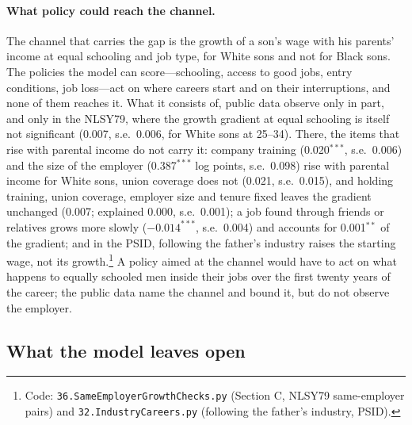\paragraph{What policy could reach the channel.} The channel that carries the gap is the growth of a son's wage with
his parents' income at equal schooling and job type, for White sons and not for Black sons. The policies the model can
score---schooling, access to good jobs, entry conditions, job loss---act on where careers start and on their
interruptions, and none of them reaches it. What it consists of, public data observe only in part, and only in the
NLSY79, where the growth gradient at equal schooling is itself not significant (0.007, s.e.\ 0.006, for White sons at
25--34). There, the items that rise with parental income do not carry it: company training (0.020$^{***}$, s.e.\
0.006) and the size of the employer (0.387$^{***}$ log points, s.e.\ 0.098) rise with parental income for White sons,
union coverage does not (0.021, s.e.\ 0.015), and holding training, union coverage, employer size and tenure fixed
leaves the gradient unchanged (0.007; explained 0.000, s.e.\ 0.001); a job found through friends or relatives grows
more slowly ($-0.014^{***}$, s.e.\ 0.004) and accounts for 0.001$^{**}$ of the gradient; and in the PSID, following the
father's industry raises the starting wage, not its growth.\footnote{Code: \texttt{36.SameEmployerGrowthChecks.py}
(Section C, NLSY79 same-employer pairs) and \texttt{32.IndustryCareers.py} (following the father's industry,
PSID).} A policy aimed at the channel would have to act on what happens to equally schooled men inside their jobs over
the first twenty years of the career; the public data name the channel and bound it, but do not observe the employer.

\subsection{What the model leaves open}\label{sec:modelopen}

